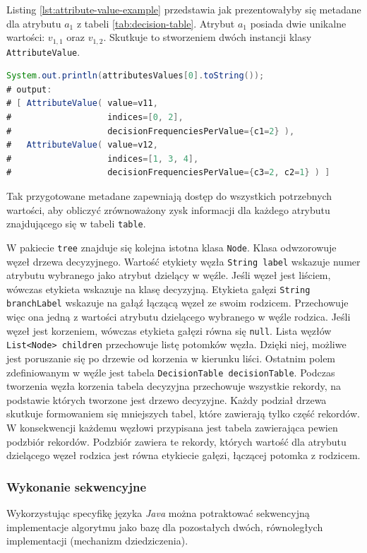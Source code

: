 \documentclass[12pt]{article}
\begin{document}
Listing \ref{lst:attribute-value-example} przedstawia jak prezentowałyby się metadane dla atrybutu $a_1$ z tabeli \ref{tab:decision-table}.
Atrybut $a_1$ posiada dwie unikalne wartości: $v_{1,1}$ oraz $v_{1,2}$. Skutkuje to stworzeniem dwóch instancji klasy \verb|AttributeValue|.

\begin{lstlisting}[language=java, caption=Metadane na przykładzie atrybutu $a_1$ z tabeli \ref{tab:decision-table},frame=single,label={lst:attribute-value-example}]
System.out.println(attributesValues[0].toString());
# output:
# [ AttributeValue( value=v11,
#                   indices=[0, 2],
#                   decisionFrequenciesPerValue={c1=2} ),
#   AttributeValue( value=v12,
#                   indices=[1, 3, 4],
#                   decisionFrequenciesPerValue={c3=2, c2=1} ) ]
\end{lstlisting}
    
Tak przygotowane metadane zapewniają dostęp do wszystkich potrzebnych wartości, aby obliczyć zrównoważony zysk informacji dla każdego
atrybutu znajdującego się w tabeli \verb|table|.

W pakiecie \verb|tree| znajduje się kolejna istotna klasa \verb|Node|. Klasa odwzorowuje węzeł drzewa decyzyjnego.
Wartość etykiety węzła \verb|String label| wskazuje numer atrybutu wybranego jako atrybut dzielący w węźle. Jeśli węzeł jest liściem, wówczas etykieta wskazuje na klasę decyzyjną.
Etykieta gałęzi \verb|String branchLabel| wskazuje na gałąź łączącą węzeł ze swoim rodzicem. Przechowuje więc ona jedną z wartości atrybutu dzielącego wybranego w węźle rodzica.
Jeśli węzeł jest korzeniem, wówczas etykieta gałęzi równa się \verb|null|. Lista węzłów \verb|List<Node> children| przechowuje listę potomków węzła. Dzięki niej, możliwe jest poruszanie się
po drzewie od korzenia w kierunku liści. Ostatnim polem zdefiniowanym w węźle jest tabela \verb|DecisionTable decisionTable|. Podczas tworzenia węzła korzenia tabela decyzyjna przechowuje
wszystkie rekordy, na podstawie których tworzone jest drzewo decyzyjne. Każdy podział drzewa skutkuje formowaniem się mniejszych tabel, które zawierają tylko część rekordów. W konsekwencji
każdemu węzłowi przypisana jest tabela zawierająca pewien podzbiór rekordów. Podzbiór zawiera te rekordy, których wartość dla atrybutu dzielącego węzeł rodzica jest równa etykiecie gałęzi, łączącej
potomka z rodzicem.

\subsubsection{Wykonanie sekwencyjne}
Wykorzystując specyfikę języka \textit{Java} można potraktować sekwencyjną implementacje algorytmu
jako bazę dla pozostałych dwóch, równoległych implementacji (mechanizm dziedziczenia).
\end{document}
